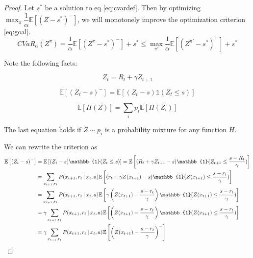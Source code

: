 \begin{proof}

Let $s^*$ be a solution to eq \ref{eq:cvardef}. Then by optimizing $\max_\pi \dfrac{1}{\alpha}\mathbb{E}
\left[ (Z-s^*)^-\right]$, we will monotonely improve the optimization criterion \ref{eq:goal}.
$$
CVaR_\alpha(Z^{\pi}) = \dfrac{1}{\alpha}\mathbb{E}
\left[ (Z^\pi-s^*)^-\right] + s^* \le \max_{\pi'}\dfrac{1}{\alpha}\mathbb{E}
\left[ (Z^{\pi'}-s^*)^-\right] + s^*
$$

Note the following facts:

\begin{equation}
Z_t = R_t + \gamma Z_{t+1}
\end{equation}

\begin{equation}
\mathbb{E}\left[(Z_t-s)^-\right] = \mathbb{E}\left[(Z_t-s)\mathbb{1}(Z_t\le s)\right]
\end{equation}

\begin{equation}
\mathbb{E}[H(Z)] = \sum_i p_i \mathbb{E}[H(Z_i)]
\end{equation}

The last equation holds if $Z\sim p_i$ is a probability mixture for any function $H$.

We can rewrite the criterion as
\begin{equation}
\begin{split}
\mathbb{E}\left[(Z_t-s)^-\right] &= \mathbb{E}\left[(Z_t-s)\mathbb{1}(Z_t\le s)\right] = \mathbb{E}\left[(R_t + \gamma Z_{t+1}-s)\mathbb{1}(Z_{t+1}\le \dfrac{s - R_t}{\gamma})\right]\\
&= \sum_{x_{t+1}, r_t} P(x_{t+1}, r_t \given x_t, a)\mathbb{E}\left[(r_t + \gamma Z(x_{t+1})-s)\mathbb{1}(Z(x_{t+1})\le \dfrac{s - r_t}{\gamma})\right]\\
&= \sum_{x_{t+1}, r_t} P(x_{t+1}, r_t \given x_t, a)\mathbb{E}\left[\gamma\left(Z(x_{t+1})-\dfrac{s-r_t}{\gamma}\right)\mathbb{1}(Z(x_{t+1})\le \dfrac{s - r_t}{\gamma})\right]\\
&= \gamma\sum_{x_{t+1}, r_t} P(x_{t+1}, r_t \given x_t, a)\mathbb{E}\left[\left(Z(x_{t+1})-\dfrac{s-r_t}{\gamma}\right)\mathbb{1}(Z(x_{t+1})\le \dfrac{s - r_t}{\gamma})\right]\\
&= \gamma\sum_{x_{t+1}, r_t} P(x_{t+1}, r_t \given x_t, a)\mathbb{E}\left[\left(Z(x_{t+1}) - \dfrac{s - r_t}{\gamma}\right)^-\right]
\end{split}
\end{equation}



\end{proof}
